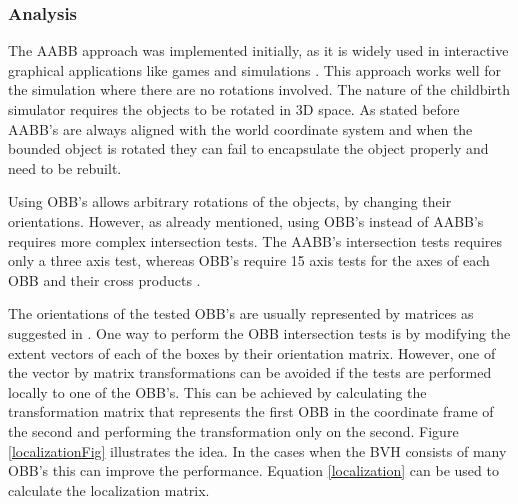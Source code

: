     \subsubsection{Analysis}
  \label{USINGOBBs}
    The AABB approach was implemented initially, as it is widely used in interactive graphical applications like games and simulations \citep{AABBUse}. This approach works well for the simulation where there are no rotations involved. The nature of the childbirth simulator requires the objects to be rotated in 3D space. As stated before AABB's are always aligned with the world coordinate system and when the bounded object is rotated they can fail to encapsulate the object properly and need to be rebuilt.

    Using OBB's allows arbitrary rotations of the objects, by changing their orientations. However, as already mentioned, using OBB's instead of AABB's requires more complex intersection tests. The AABB's intersection tests requires only a three axis test, whereas OBB's require 15 axis tests for the axes of each OBB and their cross products \citep{realTimeColDet}.



%

    The orientations of the tested OBB's are usually represented by matrices as suggested in \citep{realTimeColDet}. One way to perform the OBB intersection tests is by modifying the extent vectors of each of the boxes by their orientation matrix. However, one of the vector by matrix transformations can be avoided if the tests are performed locally to one of the OBB's. This can be achieved by calculating the transformation matrix that represents the first OBB in the coordinate frame of the second and performing the transformation only on the second. Figure \ref{localizationFig} illustrates the idea. In the cases when the BVH consists of many OBB's this can improve the performance. Equation \ref{localization} can be used to calculate the localization matrix.


